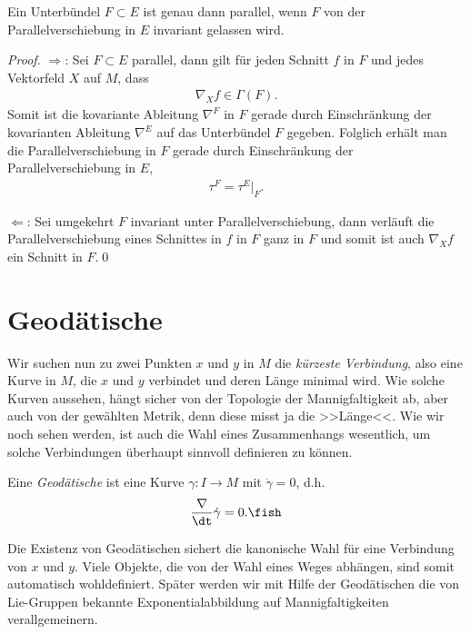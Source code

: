 \documentclass[%
	paper=a5,%
	fleqn,%
	DIV=18,%
	BCOR=0mm,
	fontsize=11pt,
	titlepage=false,%
	bibliography=totoc,
	DIV=18,%
	twoside=true,
	pdftitle=Riemannsche Geometrie,
	pdfauthor=Uwe Semmelmann,
	numbers=noendperiod]%
	{scrbook}
\begin{document}
\begin{prop}
Ein Unterbündel $F\subset E$ ist genau dann parallel, wenn $F$ von der Parallelverschiebung in $E$ invariant gelassen wird.\fish
\end{prop}
\begin{proof}
$\Rightarrow$: Sei $F\subset E$ parallel, dann gilt für jeden Schnitt $f$ in $F$ und jedes Vektorfeld $X$ auf $M$, dass
\begin{align*}
\nabla_{X} f \in \Gamma(F).
\end{align*}
Somit ist die kovariante Ableitung $\nabla^F$ in $F$ gerade durch Einschränkung der kovarianten Ableitung $\nabla^E$ auf das Unterbündel $F$ gegeben. Folglich erhält man die Parallelverschiebung in $F$ gerade durch Einschränkung der Parallelverschiebung in $E$,
\begin{align*}
\tau^F = \tau^E\bigg|_{F}.
\end{align*}

$\Leftarrow$: Sei umgekehrt $F$ invariant unter Parallelverschiebung, dann verläuft die Parallelverschiebung eines Schnittes in $f$ in $F$ ganz in $F$ und somit ist auch $\nabla_{X}f$ ein Schnitt in $F$.\qed
\end{proof}

\section{Geodätische}

Wir suchen nun zu zwei Punkten $x$ und $y$ in $M$ die \textit{kürzeste
Verbindung}, also eine Kurve in $M$, die $x$ und $y$ verbindet und deren Länge
minimal wird. Wie solche Kurven aussehen, hängt sicher von der Topologie der
Mannigfaltigkeit ab, aber auch von der gewählten Metrik, denn diese misst ja
die >>Länge<<. Wie wir noch sehen werden, ist auch die Wahl eines Zusammenhangs wesentlich, um solche Verbindungen überhaupt sinnvoll definieren zu können. 

\begin{defn}
Eine \emph{Geodätische} ist eine Kurve $\gamma\colon I\to M$ mit $\ddot{\gamma} = 0$,
d.h.
\begin{align*}
\frac{\nabla}{\dt}\dot{\gamma} = 0.\fish
\end{align*}
\end{defn}

Die Existenz von Geodätischen sichert die kanonische Wahl für eine
Verbindung von $x$ und $y$. Viele Objekte, die von der Wahl eines Weges
abhängen, sind somit automatisch wohldefiniert. Später werden wir mit Hilfe der
Geodätischen die von Lie-Gruppen bekannte Exponentialabbildung auf Mannigfaltigkeiten
verallgemeinern.
\end{document}
